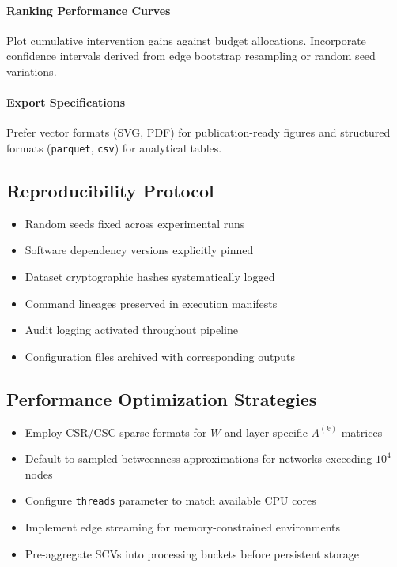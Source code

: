\documentclass[12pt]{article}
\theoremstyle{plain}
\begin{document}
\paragraph{Ranking Performance Curves}
Plot cumulative intervention gains against budget allocations. Incorporate confidence intervals derived from edge bootstrap resampling or random seed variations.

\paragraph{Export Specifications}
Prefer vector formats (SVG, PDF) for publication-ready figures and structured formats (\texttt{parquet}, \texttt{csv}) for analytical tables.

\subsection{Reproducibility Protocol}
\begin{itemize}
\item Random seeds fixed across experimental runs
\item Software dependency versions explicitly pinned
\item Dataset cryptographic hashes systematically logged
\item Command lineages preserved in execution manifests
\item Audit logging activated throughout pipeline
\item Configuration files archived with corresponding outputs
\end{itemize}

\subsection{Performance Optimization Strategies}
\begin{itemize}
\item Employ CSR/CSC sparse formats for $W$ and layer-specific $A^{(k)}$ matrices
\item Default to sampled betweenness approximations for networks exceeding $10^4$ nodes
\item Configure \texttt{threads} parameter to match available CPU cores
\item Implement edge streaming for memory-constrained environments
\item Pre-aggregate SCVs into processing buckets before persistent storage
\end{itemize}
\end{document}
